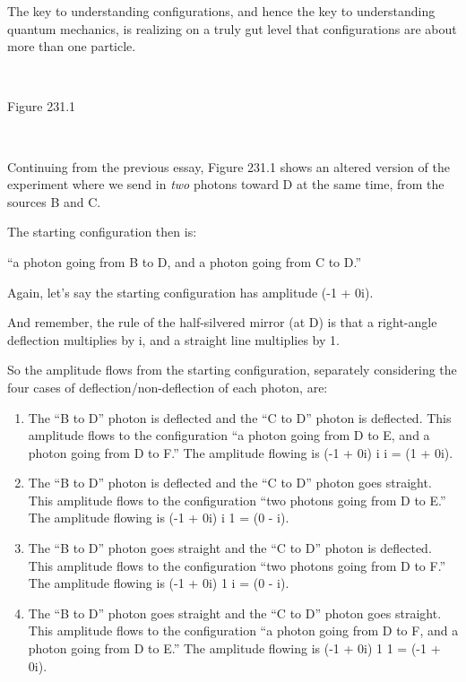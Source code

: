 {
 The key to understanding configurations, and hence the key to
understanding quantum mechanics, is realizing on a truly gut level that
configurations are about more than one particle.}

{
 ~}

{\centering
{}
 \newline
 Figure 231.1
\par}


\bigskip

{
 ~}

{
 Continuing from the previous essay, Figure 231.1 shows an altered
version of the experiment where we send in \textit{two} photons toward
D at the same time, from the sources B and C.}

{
 The starting configuration then is:}

{
 ``a photon going from B to D,\newline
 and a photon going from C to D.''}

{
 Again, let's say the starting configuration has
amplitude (-1 + 0i).}

{
 And remember, the rule of the half-silvered mirror (at D) is that
a right-angle deflection multiplies by i, and a straight line
multiplies by 1.}

{
 So the amplitude flows from the starting configuration, separately
considering the four cases of deflection/non-deflection of each photon,
are:}

\begin{enumerate}
\item The ``B to D'' photon is
deflected and the ``C to D'' photon
is deflected. This amplitude flows to the configuration
``a photon going from D to E, and a photon going from
D to F.'' The amplitude flowing is (-1 + 0i)
{\texttimes} i {\texttimes} i = (1 + 0i).

\item  The ``B to D'' photon is
deflected and the ``C to D'' photon
goes straight. This amplitude flows to the configuration
``two photons going from D to E.''
The amplitude flowing is (-1 + 0i) {\texttimes} i {\texttimes} 1 = (0 -
i).

\item The ``B to D'' photon goes
straight and the ``C to D'' photon
is deflected. This amplitude flows to the configuration
``two photons going from D to F.''
The amplitude flowing is (-1 + 0i) {\texttimes} 1 {\texttimes} i = (0 -
i).

\item  The ``B to D'' photon goes
straight and the ``C to D'' photon
goes straight. This amplitude flows to the configuration
``a photon going from D to F, and a photon going from
D to E.'' The amplitude flowing is (-1 + 0i)
{\texttimes} 1 {\texttimes} 1 = (-1 + 0i).
\end{enumerate}

